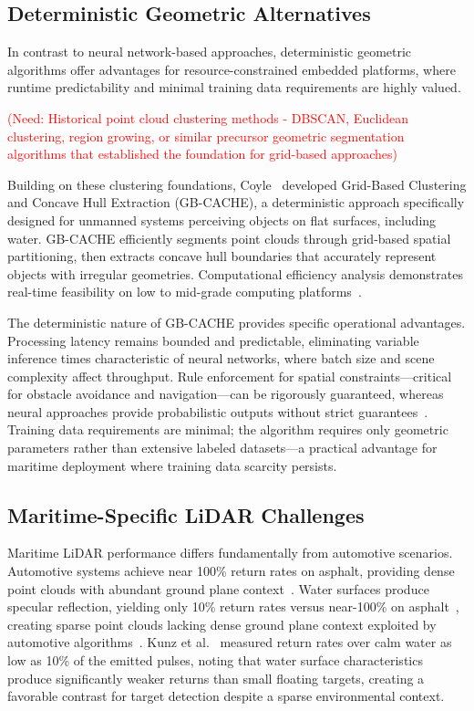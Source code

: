 \documentclass[../main.tex]{subfiles}
\begin{document}
\subsection{Deterministic Geometric Alternatives}

In contrast to neural network-based approaches, deterministic geometric algorithms offer advantages for resource-constrained embedded platforms, where runtime predictability and minimal training data requirements are highly valued.

\textcolor{red}{(Need: Historical point cloud clustering methods - DBSCAN, Euclidean clustering, region growing, or similar precursor geometric segmentation algorithms that established the foundation for grid-based approaches)}

Building on these clustering foundations, Coyle~\cite{coyleE} developed Grid-Based Clustering and Concave Hull Extraction (GB-CACHE), a deterministic approach specifically designed for unmanned systems perceiving objects on flat surfaces, including water.
GB-CACHE efficiently segments point clouds through grid-based spatial partitioning, then extracts concave hull boundaries that accurately represent objects with irregular geometries.
Computational efficiency analysis demonstrates real-time feasibility on low to mid-grade computing platforms~\cite{coyleE}.

The deterministic nature of GB-CACHE provides specific operational advantages.
Processing latency remains bounded and predictable, eliminating variable inference times characteristic of neural networks, where batch size and scene complexity affect throughput.
Rule enforcement for spatial constraints---critical for obstacle avoidance and navigation---can be rigorously guaranteed, whereas neural approaches provide probabilistic outputs without strict guarantees~\cite{coyleE}.
Training data requirements are minimal; the algorithm requires only geometric parameters rather than extensive labeled datasets---a practical advantage for maritime deployment where training data scarcity persists.

\subsection{Maritime-Specific LiDAR Challenges}

Maritime \ac{LiDAR} performance differs fundamentally from automotive scenarios.
Automotive systems achieve near 100\% return rates on asphalt, providing dense point clouds with abundant ground plane context~\cite{roriz2022}.
Water surfaces produce specular reflection, yielding only 10\% return rates versus near-100\% on asphalt~\cite{kunz2005, roriz2022}, creating sparse point clouds lacking dense ground plane context exploited by automotive algorithms~\cite{zhou2018, shi2019}.
Kunz et al.~\cite{kunz2005} measured return rates over calm water as low as 10\% of the emitted pulses, noting that water surface characteristics produce significantly weaker returns than small floating targets, creating a favorable contrast for target detection despite a sparse environmental context.
\end{document}
